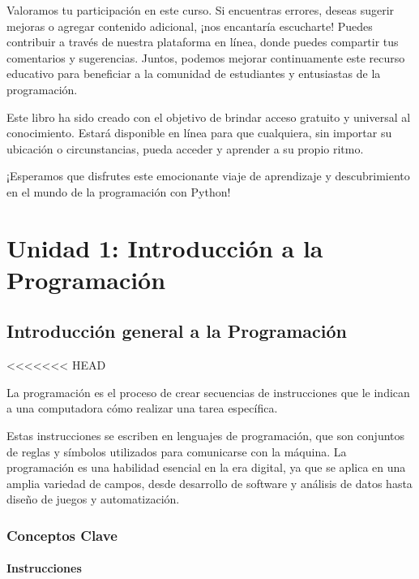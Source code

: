 \documentclass[
  a4paper,
  onepage,
  openany]{scrreprt}
\begin{document}
Valoramos tu participación en este curso. Si encuentras errores, deseas
sugerir mejoras o agregar contenido adicional, ¡nos encantaría
escucharte! Puedes contribuir a través de nuestra plataforma en línea,
donde puedes compartir tus comentarios y sugerencias. Juntos, podemos
mejorar continuamente este recurso educativo para beneficiar a la
comunidad de estudiantes y entusiastas de la programación.

Este libro ha sido creado con el objetivo de brindar acceso gratuito y
universal al conocimiento. Estará disponible en línea para que
cualquiera, sin importar su ubicación o circunstancias, pueda acceder y
aprender a su propio ritmo.

¡Esperamos que disfrutes este emocionante viaje de aprendizaje y
descubrimiento en el mundo de la programación con Python!

\part{Unidad 1: Introducción a la Programación}

\hypertarget{introducciuxf3n-general-a-la-programaciuxf3n}{%
\chapter{Introducción general a la
Programación}\label{introducciuxf3n-general-a-la-programaciuxf3n}}

\textless\textless\textless\textless\textless\textless\textless{} HEAD

La programación es el proceso de crear secuencias de instrucciones que
le indican a una computadora cómo realizar una tarea específica.

Estas instrucciones se escriben en lenguajes de programación, que son
conjuntos de reglas y símbolos utilizados para comunicarse con la
máquina. La programación es una habilidad esencial en la era digital, ya
que se aplica en una amplia variedad de campos, desde desarrollo de
software y análisis de datos hasta diseño de juegos y automatización.

\hypertarget{conceptos-clave}{%
\section{Conceptos Clave}\label{conceptos-clave}}

\hypertarget{instrucciones}{%
\subsection{Instrucciones}\label{instrucciones}}
\end{document}
